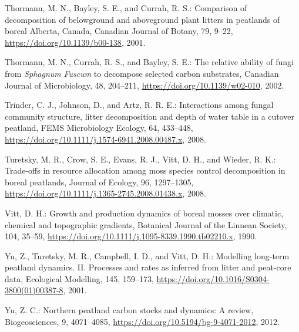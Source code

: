 \documentclass[
  12pt,
]{article}
\newlength{\cslhangindent}
\newlength{\cslentryspacingunit} %
\newenvironment{CSLReferences}[2] %
 {%
  \setlength{\parindent}{0pt}
  \ifodd #1
  \let\oldpar\par
  \def\par{\hangindent=\cslhangindent\oldpar}
  \fi
  \setlength{\parskip}{#2\cslentryspacingunit}
 }%
 {}
\begin{document}
\begin{CSLReferences}{0}{0}
\leavevmode{}%
Thormann, M. N., Bayley, S. E., and Currah, R. S.: Comparison of decomposition of belowground and aboveground plant litters in peatlands of boreal {Alberta}, {Canada}, Canadian Journal of Botany, 79, 9--22, \url{https://doi.org/10.1139/b00-138}, 2001.

\leavevmode{}%
Thormann, M. N., Currah, R. S., and Bayley, S. E.: The relative ability of fungi from {\emph{Sphagnum}}{ \emph{Fuscum}} to decompose selected carbon substrates, Canadian Journal of Microbiology, 48, 204--211, \url{https://doi.org/10.1139/w02-010}, 2002.

\leavevmode{}%
Trinder, C. J., Johnson, D., and Artz, R. R. E.: Interactions among fungal community structure, litter decomposition and depth of water table in a cutover peatland, FEMS Microbiology Ecology, 64, 433--448, \url{https://doi.org/10.1111/j.1574-6941.2008.00487.x}, 2008.

\leavevmode{}%
Turetsky, M. R., Crow, S. E., Evans, R. J., Vitt, D. H., and Wieder, R. K.: Trade-offs in resource allocation among moss species control decomposition in boreal peatlands, Journal of Ecology, 96, 1297--1305, \url{https://doi.org/10.1111/j.1365-2745.2008.01438.x}, 2008.

\leavevmode{}%
Vitt, D. H.: Growth and production dynamics of boreal mosses over climatic, chemical and topographic gradients, Botanical Journal of the Linnean Society, 104, 35--59, \url{https://doi.org/10.1111/j.1095-8339.1990.tb02210.x}, 1990.

\leavevmode{}%
Yu, Z., Turetsky, M. R., Campbell, I. D., and Vitt, D. H.: Modelling long-term peatland dynamics. {II}. {Processes} and rates as inferred from litter and peat-core data, Ecological Modelling, 145, 159--173, \url{https://doi.org/10.1016/S0304-3800(01)00387-8}, 2001.

\leavevmode{}%
Yu, Z. C.: Northern peatland carbon stocks and dynamics: A review, Biogeosciences, 9, 4071--4085, \url{https://doi.org/10.5194/bg-9-4071-2012}, 2012.

\end{CSLReferences}
\end{document}

